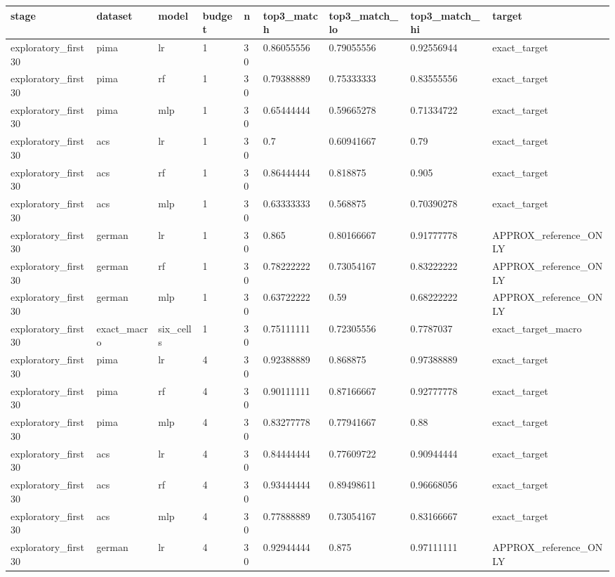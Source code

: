\begin{tabular}{lllllllll}
\toprule
stage & dataset & model & budget & n & top3\_match & top3\_match\_lo & top3\_match\_hi & target \\
\midrule
exploratory\_first30 & pima & lr & 1 & 30 & 0.86055556 & 0.79055556 & 0.92556944 & exact\_target \\
exploratory\_first30 & pima & rf & 1 & 30 & 0.79388889 & 0.75333333 & 0.83555556 & exact\_target \\
exploratory\_first30 & pima & mlp & 1 & 30 & 0.65444444 & 0.59665278 & 0.71334722 & exact\_target \\
exploratory\_first30 & acs & lr & 1 & 30 & 0.7 & 0.60941667 & 0.79 & exact\_target \\
exploratory\_first30 & acs & rf & 1 & 30 & 0.86444444 & 0.818875 & 0.905 & exact\_target \\
exploratory\_first30 & acs & mlp & 1 & 30 & 0.63333333 & 0.568875 & 0.70390278 & exact\_target \\
exploratory\_first30 & german & lr & 1 & 30 & 0.865 & 0.80166667 & 0.91777778 & APPROX\_reference\_ONLY \\
exploratory\_first30 & german & rf & 1 & 30 & 0.78222222 & 0.73054167 & 0.83222222 & APPROX\_reference\_ONLY \\
exploratory\_first30 & german & mlp & 1 & 30 & 0.63722222 & 0.59 & 0.68222222 & APPROX\_reference\_ONLY \\
exploratory\_first30 & exact\_macro & six\_cells & 1 & 30 & 0.75111111 & 0.72305556 & 0.7787037 & exact\_target\_macro \\
exploratory\_first30 & pima & lr & 4 & 30 & 0.92388889 & 0.868875 & 0.97388889 & exact\_target \\
exploratory\_first30 & pima & rf & 4 & 30 & 0.90111111 & 0.87166667 & 0.92777778 & exact\_target \\
exploratory\_first30 & pima & mlp & 4 & 30 & 0.83277778 & 0.77941667 & 0.88 & exact\_target \\
exploratory\_first30 & acs & lr & 4 & 30 & 0.84444444 & 0.77609722 & 0.90944444 & exact\_target \\
exploratory\_first30 & acs & rf & 4 & 30 & 0.93444444 & 0.89498611 & 0.96668056 & exact\_target \\
exploratory\_first30 & acs & mlp & 4 & 30 & 0.77888889 & 0.73054167 & 0.83166667 & exact\_target \\
exploratory\_first30 & german & lr & 4 & 30 & 0.92944444 & 0.875 & 0.97111111 & APPROX\_reference\_ONLY \\

\end{tabular}
